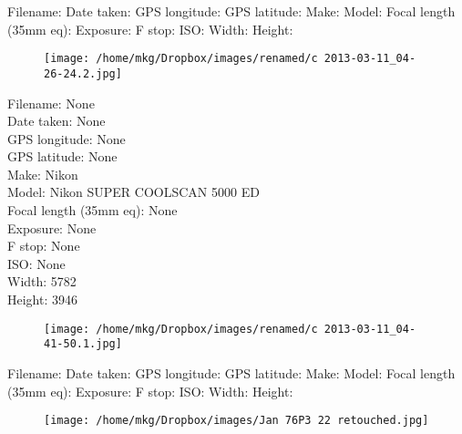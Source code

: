 \clearpage
\recalctypearea
\newpage
\noindent
Filename: Date taken: GPS longitude: GPS latitude: Make: Model: Focal length (35mm eq): Exposure: F stop: ISO: Width: Height: 
\clearpage
\recalctypearea
\newpage
\noindent
\begin{figure}
    \texttt{[image: /home/mkg/Dropbox/images/renamed/c 2013-03-11\_04-26-24.2.jpg]}
\end{figure}

\clearpage
\recalctypearea
\newpage
\noindent
Filename: None\\ 
Date taken: None\\ 
GPS longitude: None\\ 
GPS latitude: None\\ 
Make: Nikon\\ 
Model: Nikon SUPER COOLSCAN 5000 ED\\ 
Focal length (35mm eq): None\\ 
Exposure: None\\ 
F stop: None\\ 
ISO: None\\ 
Width: 5782\\ 
Height: 3946\\ 

\clearpage
\recalctypearea
\newpage
\noindent
\begin{figure}
    \texttt{[image: /home/mkg/Dropbox/images/renamed/c 2013-03-11\_04-41-50.1.jpg]}
\end{figure}

\clearpage
\recalctypearea
\newpage
\noindent
Filename: Date taken: GPS longitude: GPS latitude: Make: Model: Focal length (35mm eq): Exposure: F stop: ISO: Width: Height: 
\clearpage
\recalctypearea
\newpage
\noindent
\begin{figure}
    \texttt{[image: /home/mkg/Dropbox/images/Jan 76P3 22 retouched.jpg]}
\end{figure}


